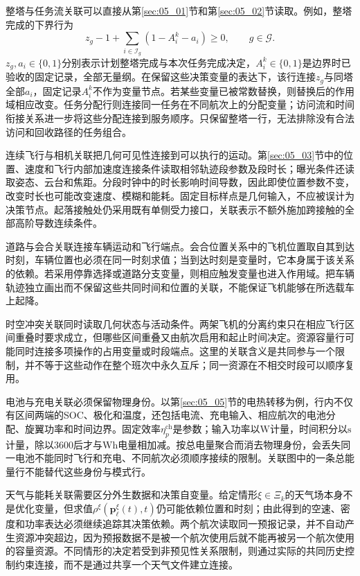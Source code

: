 整塔与任务流关联可以直接从第\ref{sec:05_01}节和第\ref{sec:05_02}节读取。例如，整塔完成的下界行为
\begin{equation}
 z_g-1+\sum_{i\in\mathcal I_g}(1-A_i^k-a_i)\ge0,
 \qquad g\in\mathcal G.
 \label{s0510:tower_scope_example}
\end{equation}
$z_g,a_i\in\{0,1\}$分别表示计划整塔完成与本次任务完成决定，$A_i^k\in\{0,1\}$是边界时已验收的固定记录，全部无量纲。在保留这些决策变量的表达下，该行连接$z_g$与同塔全部$a_i$，固定记录$A_i^k$不作为变量节点。若某些变量已被常数替换，则替换后的作用域相应改变。任务分配行则连接同一任务在不同航次上的分配变量；访问流和时间衔接关系进一步将这些分配连接到服务顺序。只保留整塔一行，无法排除没有合法访问和回收路径的任务组合。

连续飞行与相机关联把几何可见性连接到可以执行的运动。第\ref{sec:05_03}节中的位置、速度和飞行内部加速度连接条件读取相邻轨迹段参数及段时长；曝光条件还读取姿态、云台和焦距。分段时钟中的时长影响时间导数，因此即使位置参数不变，改变时长也可能改变速度、模糊和能耗。固定目标样点是几何输入，不应被误计为决策节点。起落接触处仍采用既有单侧受力接口，关联表示不额外施加跨接触的全部高阶导数连续条件。

道路与会合关联连接车辆运动和飞行端点。会合位置关系中的飞机位置取自其到达时刻，车辆位置也必须在同一时刻求值；当到达时刻是变量时，它本身属于该关系的依赖。若采用停靠选择或道路分支变量，则相应触发变量也进入作用域。把车辆轨迹独立画出而不保留这些共同时间和位置的关联，不能保证飞机能够在所选载车上起降。

时空冲突关联同时读取几何状态与活动条件。两架飞机的分离约束只在相应飞行区间重叠时要求成立，但哪些区间重叠又由航次启用和起止时间决定。资源容量行可能同时连接多项操作的占用变量或时段端点。这里的关联含义是共同参与一个限制，并不等于这些动作在整个班次中永久互斥；同一资源在不相交时段可以顺序复用。

电池与充电关联必须保留物理身份。以第\ref{sec:05_05}节的电热转移为例，行内不仅有区间两端的SOC、极化和温度，还包括电流、充电输入、相应航次的电池分配、旋翼功率和时间边界。固定效率$\eta_p^{\mathrm{ch}}$是参数；输入功率以$\mathrm W$计量，时间积分以$\mathrm s$计量，除以$3600$后才与$\mathrm{Wh}$电量相加减。按总电量聚合而消去物理身份，会丢失同一电池不能同时飞行和充电、不同航次必须顺序接续的限制。关联图中的一条总能量行不能替代这些身份与模式行。

天气与能耗关联需要区分外生数据和决策自变量。给定情形$\xi\in\Xi_k$的天气场本身不是优化变量，但求值$\rho^\xi(\mathbf p_\ell^\xi(t),t)$仍可能依赖位置和时刻；由此得到的空速、密度和功率表达必须继续追踪其决策依赖。两个航次读取同一预报记录，并不自动产生资源冲突超边，因为预报数据不是被一个航次使用后就不能再被另一个航次使用的容量资源。不同情形的决定若受到非预见性关系限制，则通过实际的共同历史控制约束连接，而不是通过共享一个天气文件建立连接。


